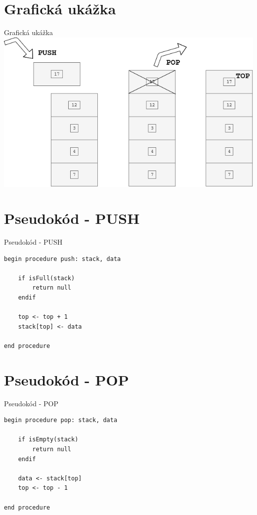 \documentclass{beamer}
\begin{document}
\section{Grafická ukážka}
\begin{frame}{Grafická ukážka}
    \includegraphics[scale=0.5]{example.png}
\end{frame}

\section{Pseudokód - PUSH}
\begin{frame}[fragile,c]{Pseudokód - PUSH}
    \begin{lstlisting}[caption=Procedúra PUSH nad dátovou štruktúrou zásobník,captionpos=b]
begin procedure push: stack, data

    if isFull(stack)
        return null
    endif
    
    top <- top + 1
    stack[top] <- data

end procedure
\end{lstlisting}
\end{frame}


\section{Pseudokód - POP}
\begin{frame}[fragile,c]{Pseudokód - POP}
\begin{lstlisting}[caption=Procedúra POP nad dátovou štruktúrou zásobník,captionpos=b]
begin procedure pop: stack, data

    if isEmpty(stack)
        return null
    endif
    
    data <- stack[top]
    top <- top - 1

end procedure
\end{lstlisting}
\end{frame}
\end{document}
